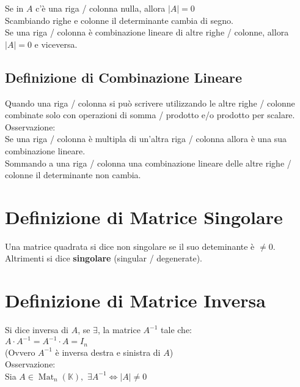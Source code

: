 \documentclass[a4paper, twoside, italian, 11pt]{book}
\newcommand{\detm}[1] {\left | #1 \right |}
\DeclareMathOperator{\Mat}{Mat}
\newcommand{\K}{\mathbb K}
\begin{document}
\noindent
Se in $A$ c'è una riga / colonna nulla, allora $\detm A = 0$ \\

\noindent
Scambiando righe e colonne %
il determinante cambia di segno. \\

\noindent
Se una riga / colonna è combinazione lineare di altre righe / colonne, allora $\detm A = 0$ e viceversa.


\subsection{Definizione di Combinazione Lineare}

Quando una riga / colonna si può scrivere utilizzando le altre righe / colonne combinate solo con operazioni di somma / prodotto e/o prodotto per scalare. \\

\noindent
Osservazione: \\
Se una riga / colonna è multipla di un'altra riga / colonna allora è una sua combinazione lineare. \\

\noindent
Sommando a una riga / colonna una combinazione lineare delle altre righe / colonne il determinante non cambia. \\



\section{Definizione di Matrice Singolare}
Una matrice quadrata si dice non singolare se il suo deteminante è $\neq 0$. Altrimenti si dice \textbf{singolare} (singular / degenerate).



\section{Definizione di Matrice Inversa}

Si dice inversa di $A$, se $\exists$, la matrice $A^{-1}$ tale che: \\

\noindent
$A \cdot A^{-1} = A^{-1} \cdot A = I_n$ \\

\noindent
(Ovvero $A^{-1}$ è inversa destra e sinistra di $A$) \\

\noindent
Osservazione: \\
Sia $A \in \Mat_n(\K),$ $\exists A^{-1} \iff \detm A \neq 0$ \\
\end{document}
